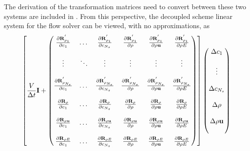 The derivation of the transformation matrices need to convert between these two
systems are included in .  From this perspective,
the decoupled scheme linear system for the flow solver can be viewed, with no
approximations, as
\begin{equation}
  \left[ 
    \frac{V}{\Delta t} \mi + 
    \begin{pmatrix}
      \rpdiff{\rho_1}{c_1}      & \dots  & \rpdiff{\rho_1}{c_{N_s}}     & \rpdiff{\rho_1}{\rho}     & \rpdiff{\rho_1}{\rho \vu}     &  \rpdiff{\rho_1}{\rho E}  \\ \\
      \vdots                    & \ddots & \vdots                       & \vdots                    & \vdots                        & \vdots                    \\ \\
      \rpdiff{\rho_{N_s}}{c_1}  & \dots  & \rpdiff{\rho_{N_s}}{c_{N_s}} & \rpdiff{\rho_{N_s}}{\rho} & \rpdiff{\rho_{N_s}}{\rho \vu} &  \rpdiff{\rho_{N_s}}{\rho E}    \\ \\
      \rdiff{\rho}{c_1}         & \dots  & \rdiff{\rho}{c_{N_s}}        & \rdiff{\rho}{\rho}        & \rdiff{\rho}{\rho \vu}        &  \rdiff{\rho}{\rho E}     \\ \\
      \rdiff{\rho \vu}{c_1}     & \dots  & \rdiff{\rho \vu}{c_{N_s}}    & \rdiff{\rho \vu}{\rho}    & \rdiff{\rho \vu}{\rho \vu}    &  \rdiff{\rho \vu}{\rho E} \\ \\
      \rdiff{\rho E}{c_1}       & \dots  & \rdiff{\rho E}{c_{N_s}}      & \rdiff{\rho E}{\rho}      & \rdiff{\rho E}{\rho \vu}      &  \rdiff{\rho E}{\rho E}
    \end{pmatrix}
  \right]
  \begin{pmatrix}
    \Delta c_1      \\ \\
    \vdots     \\ \\
    \Delta c_{N_s}  \\ \\
    \Delta \rho     \\ \\
    \Delta \rho \vu \\ \\

\end{pmatrix}
\end{equation}

